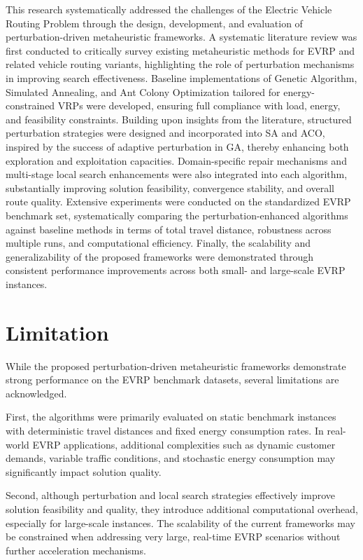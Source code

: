 This research systematically addressed the challenges of the Electric Vehicle Routing Problem through the design, development, and evaluation of perturbation-driven metaheuristic frameworks.  
A systematic literature review was first conducted to critically survey existing metaheuristic methods for EVRP and related vehicle routing variants, highlighting the role of perturbation mechanisms in improving search effectiveness.  
Baseline implementations of Genetic Algorithm, Simulated Annealing, and Ant Colony Optimization tailored for energy-constrained VRPs were developed, ensuring full compliance with load, energy, and feasibility constraints.  
Building upon insights from the literature, structured perturbation strategies were designed and incorporated into SA and ACO, inspired by the success of adaptive perturbation in GA, thereby enhancing both exploration and exploitation capacities.  
Domain-specific repair mechanisms and multi-stage local search enhancements were also integrated into each algorithm, substantially improving solution feasibility, convergence stability, and overall route quality.  
Extensive experiments were conducted on the standardized EVRP benchmark set, systematically comparing the perturbation-enhanced algorithms against baseline methods in terms of total travel distance, robustness across multiple runs, and computational efficiency.  
Finally, the scalability and generalizability of the proposed frameworks were demonstrated through consistent performance improvements across both small- and large-scale EVRP instances.


\section{Limitation}

While the proposed perturbation-driven metaheuristic frameworks demonstrate strong performance on the EVRP benchmark datasets, several limitations are acknowledged.

First, the algorithms were primarily evaluated on static benchmark instances with deterministic travel distances and fixed energy consumption rates.  
In real-world EVRP applications, additional complexities such as dynamic customer demands, variable traffic conditions, and stochastic energy consumption may significantly impact solution quality.

Second, although perturbation and local search strategies effectively improve solution feasibility and quality, they introduce additional computational overhead, especially for large-scale instances.  
The scalability of the current frameworks may be constrained when addressing very large, real-time EVRP scenarios without further acceleration mechanisms.

